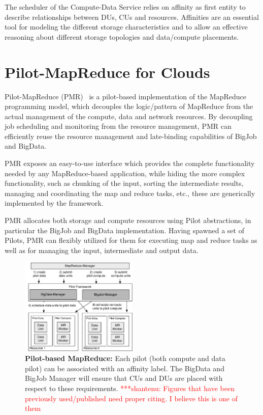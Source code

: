 \documentclass[times]{cpeauth}
\newcommand{\jhanote}[1]{ {\textcolor{red} { ***shantenu: #1 }}}
\newcommand{\jhanote}[1]{}
\newcommand{\pilot}{Pilot\xspace}
\newcommand{\pilots}{Pilots\xspace}
\newcommand{\computedataservice}{Compute-Data Service\xspace}
\newcommand{\dus}{DUs\xspace}
\newcommand{\cus}{CUs\xspace}
\begin{document}
The scheduler of the \computedataservice relies on affinity as first entity to
describe relationships between \dus, \cus and resources. Affinities are an
essential tool for modeling the different storage characteristics and to allow
an effective reasoning about different storage topologies and data/compute
placements.



\section{Pilot-MapReduce for Clouds}

Pilot-MapReduce (PMR)~\cite{Mantha:2012:PEF:2287016.2287020} is a pilot-based
implementation of the MapReduce programming model, which decouples the
logic/pattern of MapReduce from the actual management of the compute, data and
network resources. By decoupling job scheduling and monitoring from the
resource management, PMR can efficiently reuse the resource management and
late-binding capabilities of BigJob and BigData.

PMR exposes an easy-to-use interface which provides the complete
functionality needed by any MapReduce-based application, while hiding
the more complex functionality, such as chunking of the input, sorting
the intermediate results, managing and coordinating the map and reduce
tasks, etc., these are generically implemented by the
framework.

PMR allocates both storage and compute resources using \pilot abstractions, in
particular the BigJob and BigData implementation. Having spawned a set of
\pilots, PMR can flexibly utilized for them for executing map and reduce tasks
as well as for managing the input, intermediate and output data.


\begin{figure}[t]
	\centering
	\includegraphics[width=0.5\textwidth]{figures/mr-arch.pdf}
	\caption{\textbf{Pilot-based MapReduce:} Each pilot (both
          compute and data pilot) can be associated with an affinity
          label. The BigData and BigJob Manager will ensure that CUs
          and DUs are placed with respect to these
          requirements. \jhanote{Figures that have been previously
            used/published need proper citing. I believe this is one of them}}
	\label{fig:figures_mapreduce-pilotdata}
\end{figure}
\end{document}
